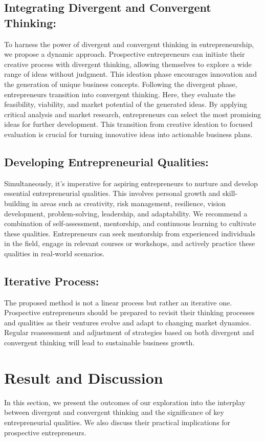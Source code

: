 \documentclass[12pt]{report}
\begin{document}
\subsection*{Integrating Divergent and Convergent Thinking:}To harness the power of divergent and convergent thinking in entrepreneurship, we propose
a dynamic approach. Prospective entrepreneurs can initiate their creative process with
divergent thinking, allowing themselves to explore a wide range of ideas without judgment.
This ideation phase encourages innovation and the generation of unique business concepts.
Following the divergent phase, entrepreneurs transition into convergent thinking. Here,
they evaluate the feasibility, viability, and market potential of the generated ideas. By
applying critical analysis and market research, entrepreneurs can select the most promising ideas for further development. This transition from creative ideation to focused evaluation
is crucial for turning innovative ideas into actionable business plans.
\subsection*{Developing Entrepreneurial Qualities:} Simultaneously, it’s imperative for aspiring entrepreneurs to nurture and develop essential
entrepreneurial qualities. This involves personal growth and skill-building in areas such
as creativity, risk management, resilience, vision development, problem-solving, leadership,
and adaptability.
We recommend a combination of self-assessment, mentorship, and continuous learning to
cultivate these qualities. Entrepreneurs can seek mentorship from experienced individuals
in the field, engage in relevant courses or workshops, and actively practice these qualities
in real-world scenarios.
\subsection*{Iterative Process:} The proposed method is not a linear process but rather an iterative one. Prospective entrepreneurs should be prepared to revisit their thinking processes and qualities as their ventures evolve and adapt to changing market dynamics. Regular reassessment and adjustment of strategies based on both divergent and convergent thinking will lead to sustainable
business growth.


\newpage
\section*{Result and Discussion}
In this section, we present the outcomes of our exploration into the interplay between
divergent and convergent thinking and the significance of key entrepreneurial qualities. We
also discuss their practical implications for prospective entrepreneurs.\cite{entrpreneur}
\end{document}
